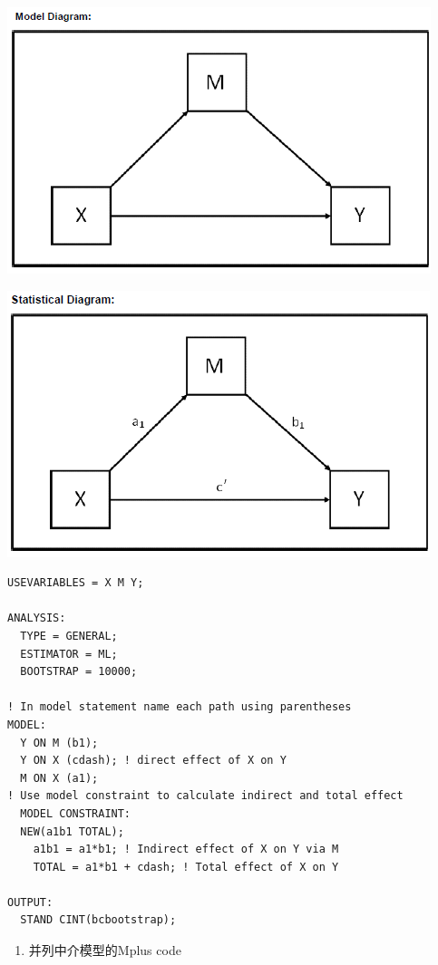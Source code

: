 \documentclass[
]{book}
\providecommand{\tightlist}{%
  \setlength{\itemsep}{0pt}\setlength{\parskip}{0pt}}
\begin{document}
\includegraphics{figs/1131.png}

\includegraphics{figs/1132.png}

\begin{verbatim}
USEVARIABLES = X M Y;

ANALYSIS:
  TYPE = GENERAL;
  ESTIMATOR = ML;
  BOOTSTRAP = 10000;

! In model statement name each path using parentheses
MODEL:
  Y ON M (b1);
  Y ON X (cdash); ! direct effect of X on Y
  M ON X (a1);
! Use model constraint to calculate indirect and total effect
  MODEL CONSTRAINT:
  NEW(a1b1 TOTAL);
    a1b1 = a1*b1; ! Indirect effect of X on Y via M
    TOTAL = a1*b1 + cdash; ! Total effect of X on Y

OUTPUT:
  STAND CINT(bcbootstrap);
\end{verbatim}

\begin{enumerate}
\def\labelenumi{\arabic{enumi}.}
\setcounter{enumi}{1}
\tightlist
\item
  并列中介模型的Mplus code
\end{enumerate}
\end{document}
